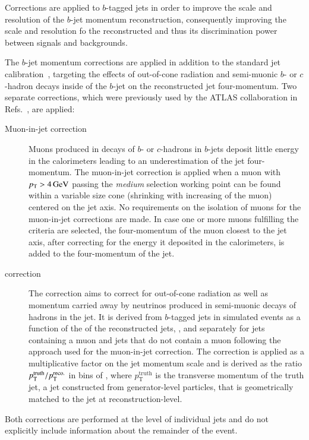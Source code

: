Corrections are applied to $b$-tagged jets in order to improve the
scale and resolution of the $b$-jet momentum reconstruction,
consequently improving the scale and resolution fo the reconstructed
\mBB and thus its discrimination power between signals and
backgrounds.

The $b$-jet momentum corrections are applied in addition to the
standard jet calibration~\cite{JETM-2018-05}, targeting the effects of
out-of-cone radiation and semi-muonic $b$- or $c$-hadron decays inside
of the $b$-jet on the reconstructed jet four-momentum. Two separate
corrections, which were previously used by the ATLAS collaboration in
Refs.~\cite{HIGG-2016-29,HIGG-2018-04,HIGG-2018-51}, are applied:
\begin{description}

\item[Muon-in-jet correction] Muons produced in decays of $b$- or
  $c$-hadrons in $b$-jets deposit little energy in the calorimeters
  leading to an underestimation of the jet four-momentum. The
  muon-in-jet correction is applied when a muon with
  $\pT > \SI{4}{\GeV}$ passing the \emph{medium} selection working
  point can be found within a variable size cone (shrinking with
  increasing \pT of the muon) centered on the jet axis. No
  requirements on the isolation of muons for the muon-in-jet
  corrections are made. In case one or more muons fulfilling the
  criteria are selected, the four-momentum of the muon closest to the
  jet axis, after correcting for the energy it deposited in the
  calorimeters, is added to the four-momentum of the jet.

\item[\pTreco correction] The \pTreco correction aims to correct for
  out-of-cone radiation as well as momentum carried away by neutrinos
  produced in semi-muonic decays of hadrons in the jet. It is derived
  from $b$-tagged jets in simulated \ttbar events as a function of the
  \pT of the reconstructed jets, \pTreco, and separately for jets
  containing a muon and jets that do not contain a muon following the
  approach used for the muon-in-jet correction. The correction is
  applied as a multiplicative factor on the jet momentum scale and is
  derived as the ratio $p_{\text{T}}^{\text{truth}} / p_{\text{T}}^{\text{reco.}}$ in bins
  of \pTreco, where $p_{\text{T}}^{\text{truth}}$ is the transverse
  momentum of the truth jet, a jet constructed from generator-level
  particles, that is geometrically matched to the jet at
  reconstruction-level.

\end{description}
Both corrections are performed at the level of individual jets and do
not explicitly include information about the remainder of the event.

